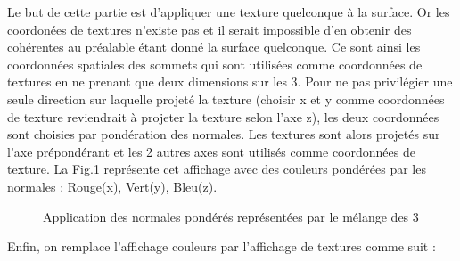 \documentclass[a4paper]{article}
\begin{document}
Le but de cette partie est d'appliquer une texture quelconque à la surface. Or les coordonées de textures n'existe pas et il serait impossible d'en obtenir des cohérentes au préalable étant donné la surface quelconque. Ce sont ainsi les coordonnées spatiales des sommets qui sont utilisées comme coordonnées de textures en ne prenant que deux dimensions sur les 3. Pour ne pas privilégier une seule direction sur laquelle projeté la texture (choisir x et y comme coordonnées de texture reviendrait à projeter la texture selon l'axe z), les deux coordonnées sont choisies par pondération des normales. Les textures sont alors projetés sur l'axe prépondérant et les 2 autres axes sont utilisés comme coordonnées de texture. La Fig.\ref{normalesCouleurs} représente cet affichage avec des couleurs pondérées par les normales : Rouge(x), Vert(y), Bleu(z). 

\begin{figure}[H]
\centering
{}
\caption{Application des normales pondérés représentées par le mélange des 3}
\label{normalesCouleurs}
\end{figure}

Enfin, on remplace l'affichage couleurs par l'affichage de textures comme suit : 
\end{document}
